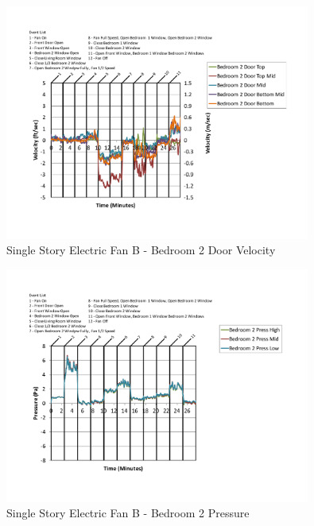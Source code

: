 \documentclass{article}
\begin{document}
\begin{appendices}
	\begin{figure}[H]
		\centering
		\includegraphics[height=3.05in,trim=0.67in 1.1in 0.67in 0.8in,clip=true]{0_Images/Results_Charts/ColdFlow/Single_Story/Electric/B/Bedroom_2_Door_Velocity.pdf}
		\caption{Single Story Electric Fan B - Bedroom 2 Door Velocity}
	\end{figure}
 

	\begin{figure}[H]
		\centering
		\includegraphics[height=3.05in,trim=0.67in 1.1in 0.67in 0.8in,clip=true]{0_Images/Results_Charts/ColdFlow/Single_Story/Electric/B/Bedroom_2_Pressure.pdf}
		\caption{Single Story Electric Fan B - Bedroom 2 Pressure}
	\end{figure}
 
	\clearpage


\end{appendices}
\end{document}
